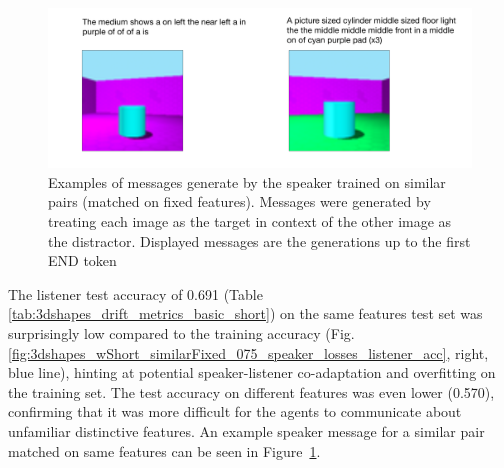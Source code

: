 \begin{figure}[h]
	\centering
	\includegraphics[width=0.9\linewidth]{images/example_generations/shapes_similarPair_cropped.pdf}
	\caption{Examples of messages generate by the speaker trained on similar pairs (matched on fixed features). Messages were generated by treating each image as the target in context of the other image as the distractor. Displayed messages are the generations up to the first END token}
	\label{fig:shapes_similarPairs_example_generations}
\end{figure}
The listener test accuracy of 0.691 (Table \ref{tab:3dshapes_drift_metrics_basic_short}) on the same features test set was surprisingly low compared to the training accuracy (Fig. \ref{fig:3dshapes_wShort_similarFixed_075_speaker_losses_listener_acc}, right, blue line), hinting at potential speaker-listener co-adaptation and overfitting on the training set. The test accuracy on different features was even lower (0.570), confirming that it was more difficult for the agents to communicate about unfamiliar distinctive features. An example speaker message for a similar pair matched on same features can be seen in Figure~\ref{fig:shapes_similarPairs_example_generations}.

